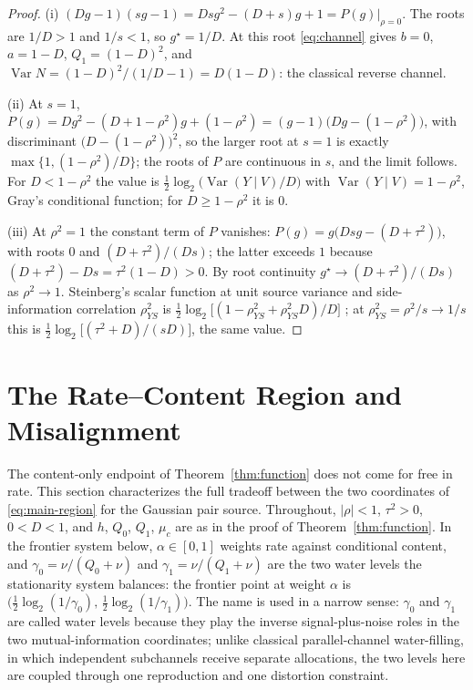 \documentclass[11pt,onecolumn]{IEEEtran}
\begin{document}
\begin{proof}
(i) $(Dg-1)(sg-1)=Dsg^2-(D+s)g+1=P(g)\big|_{\rho=0}$. The roots are
$1/D>1$ and $1/s<1$, so $g^\star=1/D$. At this root \eqref{eq:channel}
gives $b=0$, $a=1-D$, $Q_1=(1-D)^2$, and
$\operatorname{Var}N=(1-D)^2/(1/D-1)=D(1-D)$: the classical reverse
channel.

(ii) At $s=1$,
$P(g)=Dg^2-(D+1-\rho^2)g+(1-\rho^2)=(g-1)\bigl(Dg-(1-\rho^2)\bigr)$,
with discriminant $\bigl(D-(1-\rho^2)\bigr)^2$, so the larger root at
$s=1$ is exactly $\max\{1,(1-\rho^2)/D\}$; the roots of $P$ are
continuous in $s$, and the limit follows. For $D<1-\rho^2$ the value
is $\tfrac12\log_2\bigl(\operatorname{Var}(Y\mid V)/D\bigr)$ with
$\operatorname{Var}(Y\mid V)=1-\rho^2$, Gray's conditional function;
for $D\ge1-\rho^2$ it is $0$.

(iii) At $\rho^2=1$ the constant term of $P$ vanishes:
$P(g)=g\bigl(Dsg-(D+\tau^2)\bigr)$, with roots $0$ and
$(D+\tau^2)/(Ds)$; the latter exceeds $1$ because
$(D+\tau^2)-Ds=\tau^2(1-D)>0$. By root continuity
$g^\star\to(D+\tau^2)/(Ds)$ as $\rho^2\to1$. Steinberg's scalar
function at unit source variance and side-information correlation
$\rho_{YS}^2$ is
$\tfrac12\log_2\bigl[(1-\rho_{YS}^2+\rho_{YS}^2D)/D\bigr]$
\cite{steinberg2009}; at $\rho_{YS}^2=\rho^2/s\to1/s$
this is $\tfrac12\log_2\bigl[(\tau^2+D)/(sD)\bigr]$, the same value.
\end{proof}


\section{The Rate--Content Region and Misalignment}
\label{sec:region}

The content-only endpoint of Theorem~\ref{thm:function} does not come for
free in rate. This section characterizes the full tradeoff between the
two coordinates of \eqref{eq:main-region} for the Gaussian pair source.
Throughout, $|\rho|<1$, $\tau^2>0$, $0<D<1$, and $h$, $Q_0$,
$Q_1$, $\mu_c$ are as in the proof of Theorem~\ref{thm:function}. In
the frontier system below, $\alpha\in[0,1]$ weights rate against
conditional content, and $\gamma_0=\nu/(Q_0+\nu)$ and $\gamma_1=\nu/(Q_1+\nu)$
are the two water levels the stationarity system balances: the
frontier point at weight $\alpha$ is
$\bigl(\tfrac12\log_2(1/\gamma_0),\,\tfrac12\log_2(1/\gamma_1)\bigr)$.
The name is used in a narrow sense: $\gamma_0$ and $\gamma_1$ are
called water levels because they play the inverse
signal-plus-noise roles in the two mutual-information coordinates;
unlike classical parallel-channel water-filling, in which independent
subchannels receive separate allocations, the two levels here are
coupled through one reproduction and one distortion constraint.
\end{document}
